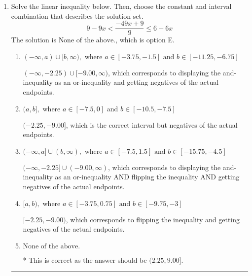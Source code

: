\documentclass{extbook}[14pt]
\newcommand{\litem}[1]{\item #1

\rule{\textwidth}{0.4pt}}
\begin{document}
\begin{enumerate}
{\begin{enumerate}[label=\Alph*.]
Corresponds to including the endpoints AND negating.
\item \( (-\infty, a) \cup (b, \infty), \text{ where } a \in [-3.75, 3] \text{ and } b \in [6.75, 9.75] \)

Corresponds to inverting the inequality and negating the solution.
\item \( (-\infty, a) \cup (b, \infty), \text{ where } a \in [-12, -3.75] \text{ and } b \in [-1.5, 7.5] \)

 * Correct option.
\item \( (-\infty, \infty) \)

Corresponds to the variable canceling, which does not happen in this instance.
\end{enumerate}

\textbf{General Comment:} When multiplying or dividing by a negative, flip the sign.
}
\litem{
Solve the linear inequality below. Then, choose the constant and interval combination that describes the solution set.
\[ 9 - 9 x < \frac{-49 x + 9}{9} \leq 6 - 6 x \]The solution is \( \text{None of the above.} \), which is option E.\begin{enumerate}[label=\Alph*.]
\item \( (-\infty, a) \cup [b, \infty), \text{ where } a \in [-3.75, -1.5] \text{ and } b \in [-11.25, -6.75] \)

$(-\infty, -2.25) \cup [-9.00, \infty)$, which corresponds to displaying the and-inequality as an or-inequality and getting negatives of the actual endpoints.
\item \( (a, b], \text{ where } a \in [-7.5, 0] \text{ and } b \in [-10.5, -7.5] \)

$(-2.25, -9.00]$, which is the correct interval but negatives of the actual endpoints.
\item \( (-\infty, a] \cup (b, \infty), \text{ where } a \in [-7.5, 1.5] \text{ and } b \in [-15.75, -4.5] \)

$(-\infty, -2.25] \cup (-9.00, \infty)$, which corresponds to displaying the and-inequality as an or-inequality AND flipping the inequality AND getting negatives of the actual endpoints.
\item \( [a, b), \text{ where } a \in [-3.75, 0.75] \text{ and } b \in [-9.75, -3] \)

$[-2.25, -9.00)$, which corresponds to flipping the inequality and getting negatives of the actual endpoints.
\item \( \text{None of the above.} \)

* This is correct as the answer should be $(2.25, 9.00]$.
\end{enumerate}

}
\end{enumerate}
\end{document}
